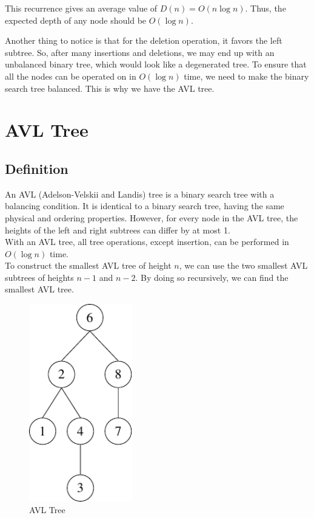 This recurrence gives an average value of \(D(n) = O(n\log n)\). Thus, the expected depth of any node should be \(O(\log n)\).

Another thing to notice is that for the deletion operation, it favors the left subtree. So, after many insertions and deletions, we may end up with an unbalanced binary tree, which would look like a degenerated tree. To ensure that all the nodes can be operated on in \(O(\log n)\) time, we need to make the binary search tree balanced. This is why we have the AVL tree.

\section{AVL Tree}
\subsection{Definition}
\begin{minipage}{0.7\textwidth}
An AVL (Adelson-Velskii and Landis) tree is a binary search tree with a balancing condition. It is identical to a binary search tree, having the same physical and ordering properties. However, for every node in the AVL tree, the heights of the left and right subtrees can differ by at most 1.\\[5pt]
With an AVL tree, all tree operations, except insertion, can be performed in \(O(\log n)\) time.\\[5pt]
To construct the smallest AVL tree of height \(n\), we can use the two smallest AVL subtrees of heights \(n-1\) and \(n-2\). By doing so recursively, we can find the smallest AVL tree.
\end{minipage}
\begin{minipage}{0.3\textwidth}
  \begin{figure}[H]
    \centering
    \includegraphics[width=0.4\textwidth]{Figure/AVL.pdf}
    \caption{AVL Tree}
  \end{figure}
\end{minipage}

